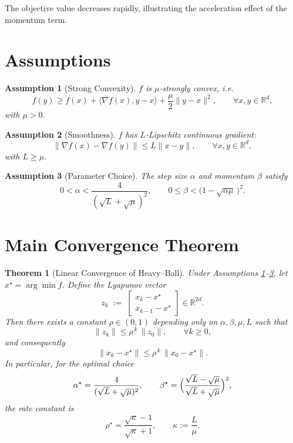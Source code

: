 \documentclass{article}
\newtheorem{theorem}{Theorem}
\newtheorem{assumption}{Assumption}
\newcommand{\R}{\mathbb{R}}
\begin{document}
The objective value decreases rapidly, illustrating the acceleration effect of the momentum term.

\newpage
\section*{Assumptions}
\begin{assumption}[Strong Convexity]\label{ass:sc}
$f$ is $\mu$‑strongly convex, i.e.
\[
f(y)\ge f(x)+\langle\nabla f(x),y-x\rangle+\frac{\mu}{2}\|y-x\|^{2},
\qquad\forall x,y\in\R^{d},
\]
with $\mu>0$.
\end{assumption}
\begin{assumption}[Smoothness]\label{ass:smooth}
$f$ has $L$‑Lipschitz continuous gradient:
\[
\|\nabla f(x)-\nabla f(y)\|\le L\|x-y\|,
\qquad\forall x,y\in\R^{d},
\]
with $L\ge\mu$.
\end{assumption}
\begin{assumption}[Parameter Choice]\label{ass:param}
The step size $\alpha$ and momentum $\beta$ satisfy
\[
0<\alpha<\frac{4}{(\sqrt{L}+\sqrt{\mu})^{2}},\qquad
0\le\beta<\bigl(1-\sqrt{\alpha\mu}\,\bigr)^{2}.
\tag{A3}
\]
\end{assumption}

\section*{Main Convergence Theorem}
\begin{theorem}[Linear Convergence of Heavy–Ball]\label{thm:linear}
Under Assumptions \ref{ass:sc}–\ref{ass:param}, let $x^{\star}=\arg\min f$.  
Define the Lyapunov vector
\[
z_{k}\;:=\;\begin{bmatrix}x_{k}-x^{\star}\\ x_{k-1}-x^{\star}\end{bmatrix}\in\R^{2d}.
\]
Then there exists a constant $\rho\in(0,1)$ depending only on $\alpha,\beta,\mu,L$ such that
\[
\|z_{k}\|\le\rho^{\,k}\,\|z_{0}\|,\qquad\forall k\ge0,
\tag{3}
\]
and consequently
\[
\|x_{k}-x^{\star}\|\le\rho^{\,k}\,\|x_{0}-x^{\star}\| .
\tag{4}
\]
In particular, for the optimal choice
\[
\alpha^{\star}= \frac{4}{(\sqrt{L}+\sqrt{\mu})^{2}},\qquad
\beta^{\star}= \Bigl(\frac{\sqrt{L}-\sqrt{\mu}}{\sqrt{L}+\sqrt{\mu}}\Bigr)^{2},
\]
the rate constant is
\[
\rho^{\star}= \frac{\sqrt{\kappa}-1}{\sqrt{\kappa}+1},\qquad
\kappa:=\frac{L}{\mu}.
\tag{5}
\]
\end{theorem}
\end{document}
